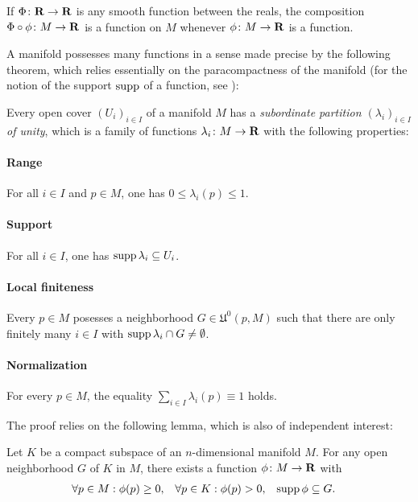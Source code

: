 If $\Phi\colon \mathbf{R} \to \mathbf{R}$ is any smooth function between the reals, 
the composition $\Phi \circ \phi\colon M \to \mathbf{R}$ is a function on $M$
whenever $\phi\colon M \to \mathbf{R}$ is a function.

A manifold possesses many functions in a sense made precise by the following theorem,
which relies essentially on the paracompactness of the manifold (for the notion
of the support $\operatorname{supp}$ of a function, see ):
\begin{thm}
  \label{thm:paracompact_manifold}
  Every open cover $(U_i)_{i \in I}$ of a manifold $M$ has a
  \emph{subordinate
  partition $(\lambda_i)_{i \in I}$ of unity}, which is a family of functions
  $\lambda_i\colon M \to \mathbf{R}$ with the following properties:

  \paragraph{Range}
  For all $i \in I$ and $p \in M$, one has $0 \leq \lambda_i(p)
  \leq 1$.
  
  \paragraph{Support}
  For all $i \in I$, one has $\operatorname{supp} \lambda_i \subseteq U_i$.
  
  \paragraph{Local finiteness}
  Every $p \in M$ posesses a neighborhood $G \in \mathfrak U^0(p, M)$ such that there
  are only finitely many $i \in I$ with $\operatorname{supp} \lambda_i \cap G \neq \emptyset$.
  
  \paragraph{Normalization}
  For every $p \in M$, the equality $\sum_{i \in I} \lambda_i(p) \equiv 1$ holds.
\end{thm}

The proof relies on the following lemma, which is also of independent interest:
\begin{lem}
  \label{lem:paracompact_manifold}
  Let $K$ be a compact subspace of an $n$-dimensional manifold $M$. For any open neighborhood
  $G$ of $K$ in $M$, there exists a function $\phi\colon M \to \mathbf{R}$ with
  \begin{align}
    \label{eq:paracompact_manifold}
    \forall p \in M: \phi(p) & \ge 0, &
    \forall p \in K: \phi(p) & > 0, &
    \operatorname{supp} \phi & \subseteq G.
  \end{align}
\end{lem}

